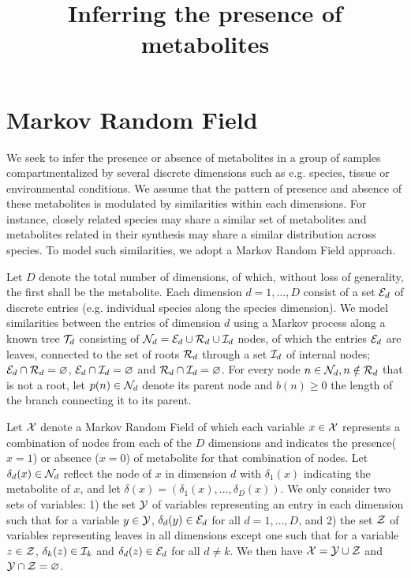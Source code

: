 \documentclass[a4paper,12pt]{article}
\title{Inferring the presence of metabolites}
\def\E{\mathbb{E}}
\def\E{{\cal E}}
\def\I{{\cal I}}
\def\N{{\cal N}}
\def\R{{\cal R}}
\def\T{{\cal T}}
\def\X{{\cal X}}
\def\Y{{\cal Y}}
\def\Z{{\cal Z}}
\begin{document}
\maketitle

\section{Markov Random Field}
We seek to infer the presence or absence of metabolites in a group of samples compartmentalized by several discrete dimensions such as e.g. species, tissue or environmental conditions. We assume that the pattern of presence and absence of these metabolites is modulated by similarities within each dimensions. For instance, closely related species may share a similar set of metabolites and  metabolites related in their synthesis may share a similar distribution across species. To model such similarities, we adopt a Markov Random Field approach.

Let $D$ denote the total number of dimensions, of which, without loss of generality, the first shall be the metabolite. Each dimension $d=1, \ldots, D$ consist of a set $\E_d$ of discrete entries (e.g. individual species along the species dimension). We model similarities between the entries of dimension $d$ using a Markov process along a known tree $\T_d$ consisting of $\N_d = \E_d \cup \R_d \cup \I_d$ nodes, of which the entries $\E_d$ are leaves, connected to the set of roots $\R_d$ through a set $\I_d$ of internal nodes; $\E_d \cap \R_d = \varnothing$, $\E_d \cap \I_d = \varnothing$ and $\R_d \cap \I_d = \varnothing$. For every node $n \in \N_d, n \notin \R_d$ that is not a root, let $p(n) \in \N_d$ denote its parent node and $b(n) \geq 0$ the length of the branch connecting it to its parent.

Let $\X$ denote a Markov Random Field of which each variable $x \in \X$ represents a combination of nodes from each of the $D$ dimensions and indicates the presence($x=1$) or absence ($x=0$) of metabolite for that combination of nodes. Let $\delta_d(x) \in \N_d$ reflect the node of $x$ in dimension $d$ with $\delta_1(x)$ indicating the metabolite of $x$, and let $\delta(x)=(\delta_1(x), \ldots, \delta_D(x))$. We only consider two sets of variables: 1) the set $\Y$ of variables representing an entry in each dimension such that for a variable $y\in\Y$, $\delta_d(y) \in \E_d$ for all $d=1, \ldots, D$, and 2) the set $\Z$ of variables representing leaves in all dimensions except one such that for a variable $z \in \Z$, $\delta_k(z) \in \I_k$ and $\delta_d(z) \in \E_d$ for all $d \neq k$. We then have $\X = \Y \cup \Z$ and $\Y \cap \Z = \varnothing$.
\end{document}
